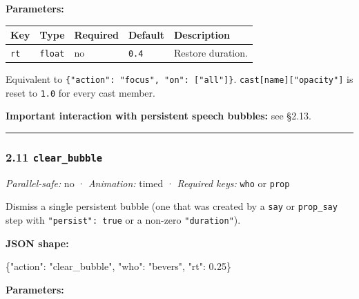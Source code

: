 \documentclass[
  11pt,
]{book}
\newenvironment{Shaded}{}{}
\newcommand{\DataTypeTok}[1]{\textcolor[rgb]{0.56,0.13,0.00}{#1}}
\newcommand{\DecValTok}[1]{\textcolor[rgb]{0.25,0.63,0.44}{#1}}
\newcommand{\ErrorTok}[1]{\textcolor[rgb]{1.00,0.00,0.00}{\textbf{#1}}}
\newcommand{\FunctionTok}[1]{\textcolor[rgb]{0.02,0.16,0.49}{#1}}
\newcommand{\StringTok}[1]{\textcolor[rgb]{0.25,0.44,0.63}{#1}}
\begin{document}
\textbf{Parameters:}

\begin{longtable}[]{@{}lllll@{}}
\toprule\noalign{}
Key & Type & Required & Default & Description \\
\midrule\noalign{}
\endhead
\bottomrule\noalign{}
\endlastfoot
\texttt{rt} & \texttt{float} & no & \texttt{0.4} & Restore duration. \\
\end{longtable}

Equivalent to \texttt{\{"action":\ "focus",\ "on":\ {[}"all"{]}\}}.
\texttt{cast{[}name{]}{[}"opacity"{]}} is reset to \texttt{1.0} for
every cast member.

\textbf{Important interaction with persistent speech bubbles:} see
§2.13.

\begin{center}\rule{0.5\linewidth}{0.5pt}\end{center}

\subsubsection{\texorpdfstring{2.11
\texttt{clear\_bubble}}{2.11 clear\_bubble}}\label{clear_bubble}

\emph{Parallel-safe:} no · \emph{Animation:} timed · \emph{Required
keys:} \texttt{who} or \texttt{prop}

Dismiss a single persistent bubble (one that was created by a
\texttt{say} or \texttt{prop\_say} step with \texttt{"persist":\ true}
or a non-zero \texttt{"duration"}).

\textbf{JSON shape:}

\begin{Shaded}
\begin{Highlighting}[]
\FunctionTok{\{}\DataTypeTok{"action"}\FunctionTok{:} \StringTok{"clear\_bubble"}\FunctionTok{,} \DataTypeTok{"who"}\FunctionTok{:} \StringTok{"bevers"}\FunctionTok{,} \DataTypeTok{"rt"}\FunctionTok{:} \DecValTok{0}\ErrorTok{.}\DecValTok{25}\FunctionTok{\}}
\end{Highlighting}
\end{Shaded}

\textbf{Parameters:}
\end{document}

